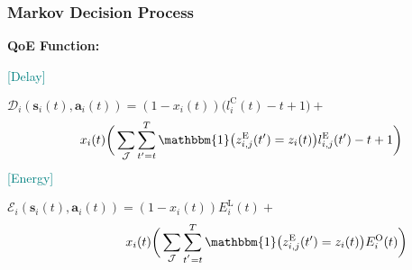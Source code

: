 \begin{frame}
	\frametitle{Markov Decision Process}
	
	\textbf{QoE Function:}

\vfill

	

	\textcolor{teal}{[Delay]}\vspace{3mm}
	
	$\mathcal{D}_i(\boldsymbol{s}_i(t),\boldsymbol{a}_i(t)) = (1-x_i(t))\Big(l_i^{\text{C}}(t) - t + 1\Big)  +$
	\begin{alignat}{2}
		\;\;\;\; x_i(t)\bigg( \sum\limits_{\mathcal{J}} \sum\limits_{t'=t}^{T}\mathbbm{1}\big(z_{i,j}^{\text{E}}(t')=z_i(t)\big) l_{i,j}^{\text{E}}(t') - t +1\bigg)
		\label{21}  
	\end{alignat} 
	\textcolor{teal}{[Energy]}\vspace{3mm}
	
	$\mathcal{E}_i(\boldsymbol{s}_i(t),\boldsymbol{a}_i(t)) = (1-x_i(t)) E_i^{\text{L}}(t)+$
	\begin{alignat}{2}
		\hspace{1.8cm} x_i(t)\bigg( \sum\limits_{\mathcal{J}} \sum\limits_{t^{'}=t}^{T}\mathbbm{1}\big(z_{i,j}^{\text{E}}(t') = z_i(t)\big) E_i^{\text{O}}(t)  \bigg)
		\label{22}  
	\end{alignat}
	
\end{frame}


